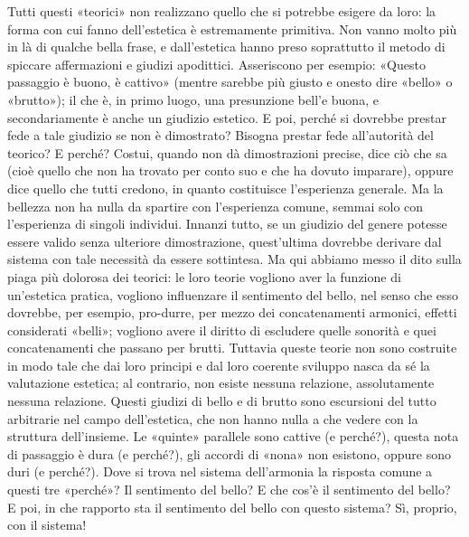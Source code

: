 Tutti questi «teorici» non realizzano quello che si potrebbe esigere da loro: la forma con cui fanno dell'estetica è estremamente primitiva. Non vanno molto più in là di qualche bella frase, e dall'estetica hanno preso soprattutto il metodo di spiccare affermazioni e giudizi apodittici. Asseriscono per esempio: «Questo passaggio è buono, è cattivo» (mentre sarebbe più giusto e onesto dire «bello» o «brutto»); il che è, in primo luogo, una presunzione bell'e buona, e secondariamente è anche un giudizio estetico. E poi, perché si dovrebbe prestar fede a tale giudizio se non è dimostrato? Bisogna prestar fede all'autorità del teorico? E perché? Costui, quando non dà dimostrazioni precise, dice ciò che sa (cioè quello che non ha trovato per conto suo e che ha dovuto imparare), oppure dice quello che tutti credono, in quanto costituisce l'esperienza generale. Ma la bellezza non ha nulla da spartire con l'esperienza comune, semmai solo con l'esperienza di singoli individui. Innanzi tutto, se un giudizio del genere potesse essere valido senza ulteriore dimostrazione, quest'ultima dovrebbe derivare dal sistema con tale necessità da essere sottintesa. Ma qui abbiamo messo il dito sulla piaga più dolorosa dei teorici: le loro teorie vogliono aver la funzione di un'estetica pratica, vogliono influenzare il sentimento del bello, nel senso che esso dovrebbe, per esempio, pro-durre, per mezzo dei concatenamenti armonici, effetti considerati «belli»; vogliono avere il diritto di escludere quelle sonorità e quei concatenamenti che passano per brutti. Tuttavia queste teorie non sono costruite in modo tale che dai loro principi e dal loro coerente sviluppo nasca da sé la valutazione estetica; al contrario, non esiste nessuna relazione, assolutamente nessuna relazione. Questi giudizi di bello e di brutto sono escursioni del tutto arbitrarie nel campo dell'estetica, che non hanno nulla a che vedere con la struttura dell'insieme. Le «quinte» parallele sono cattive (e perché?), questa nota di passaggio è dura (e perché?), gli accordi di «nona» non esistono, oppure sono duri (e perché?). Dove si trova nel sistema dell'armonia la risposta comune a questi tre «perché»? Il sentimento del bello? E che cos'è il sentimento del bello? E poi, in che rapporto sta il sentimento del bello con questo sistema? Sì, proprio, con il sistema!

